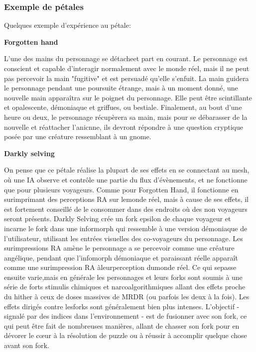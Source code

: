 \subsubsection{Exemple de pétales} 

Quelques exemple d'expérience au pétale: 

\textbf{Forgotten hand} 

L'une des mains du personnage se détacheet part en courant. Le personnage est conscient et capable d'interagir normalement avec le monde réel, mais il ne peut pas percevoir la main "fugitive" et est persuadé qu'elle s'enfuit. La main guidera le personnage pendant une poursuite étrange, mais à un moment donné, une nouvelle main apparaîtra sur le poignet du personnage. Elle peut être scintillante et opalescente, démoniaque et griffues, ou bestiale. Finalement, au bout d'une heure ou deux, le personnage récupèrera sa main, mais pour se débarasser de la nouvelle et réattacher l'anicnne, ils devront répondre à une question cryptique posée par une créature ressemblant à un gnome. 

\textbf{Darkly selving} 

On pense que ce pétale réalise la plupart de ses effets en se connectant au mesh, où une IA observe et contrôle une partie du flux d'évènements, et ne fonctionne que pour plusieurs voyageurs. Comme pour Forgotten Hand, il fonctionne en surimprimant des perceptions RA sur lemonde réel, mais à cause de ses effets, il est fortement conseillé de le consommer dans des endroits où des non voyageurs seront présents. Darkly Selving crée un fork epsilon de chaque voyageur et incarne le fork dans une informorph qui ressemble à une version démoniaque de l'utilisateur, utilisant les entrées visuelles des co-voyageurs du personnage. Les surimpressions RA amène le personnage a se percevoir comme une créature angélique, pendant que l'infomorph démoniaque et paraissant réelle apparaît comme une surimpression RA àleurperception dumonde réel. Ce qui sepasse ensuite varie,mais en générale les personnages et leurs forks sont soumis à une série de forts stimulis chimiques et narcoalgorithmiques allant des effets proche du hither à ceux de doses massives de MRDR (ou parfois les deux à la fois). Les effets dirigés contre lesforks sont généralement bien plus intenses. L'objectif - signalé par des indices dans l'environnement - est de fusionner avec son fork, ce qui peut être fait de nombreuses manières, allant de chasser son fork pour en dévorer le cœur à la résolution de puzzle ou à réussir à accomplir quelque chose avant son fork. 

